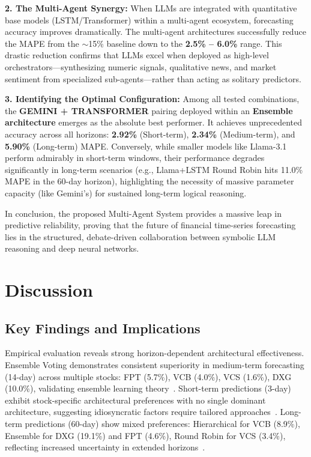 \documentclass{ieeeaccess}
\begin{document}
\textbf{2. The Multi-Agent Synergy:} When LLMs are integrated with quantitative base models (LSTM/Transformer) within a multi-agent ecosystem, forecasting accuracy improves dramatically. The multi-agent architectures successfully reduce the MAPE from the $\sim$15\% baseline down to the \textbf{2.5\% -- 6.0\%} range. This drastic reduction confirms that LLMs excel when deployed as high-level orchestrators---synthesizing numeric signals, qualitative news, and market sentiment from specialized sub-agents---rather than acting as solitary predictors.

\textbf{3. Identifying the Optimal Configuration:} Among all tested combinations, the \textbf{GEMINI + TRANSFORMER} pairing deployed within an \textbf{Ensemble architecture} emerges as the absolute best performer. It achieves unprecedented accuracy across all horizons: \textbf{2.92\%} (Short-term), \textbf{2.34\%} (Medium-term), and \textbf{5.90\%} (Long-term) MAPE. Conversely, while smaller models like Llama-3.1 perform admirably in short-term windows, their performance degrades significantly in long-term scenarios (e.g., Llama+LSTM Round Robin hits 11.0\% MAPE in the 60-day horizon), highlighting the necessity of massive parameter capacity (like Gemini's) for sustained long-term logical reasoning.

In conclusion, the proposed Multi-Agent System provides a massive leap in predictive reliability, proving that the future of financial time-series forecasting lies in the structured, debate-driven collaboration between symbolic LLM reasoning and deep neural networks.

\clearpage





\section{Discussion}
\subsection{Key Findings and Implications}
Empirical evaluation reveals strong horizon-dependent architectural effectiveness. Ensemble Voting demonstrates consistent superiority in medium-term forecasting (14-day) across multiple stocks: FPT (5.7\%), VCB (4.0\%), VCS (1.6\%), DXG (10.0\%), validating ensemble learning theory~\cite{dietterich2000ensemble}. Short-term predictions (3-day) exhibit stock-specific architectural preferences with no single dominant architecture, suggesting idiosyncratic factors require tailored approaches~\cite{campbell1997stock}. Long-term predictions (60-day) show mixed preferences: Hierarchical for VCB (8.9\%), Ensemble for DXG (19.1\%) and FPT (4.6\%), Round Robin for VCS (3.4\%), reflecting increased uncertainty in extended horizons~\cite{guidolin2007asset}.
\end{document}
